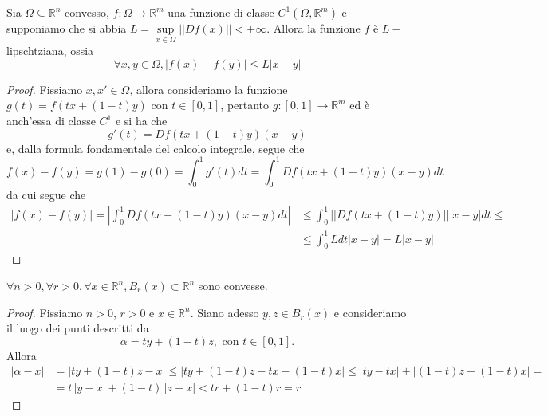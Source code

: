 \begin{theorem}
	Sia $\Omega \subseteq \mathbb{R}^n$ convesso, $f: \Omega \to \mathbb{R}^m$ una funzione di classe $C^1(\Omega, \mathbb{R}^m)$ e supponiamo che si abbia $L = \sup\limits_{x \in \Omega} ||Df(x)|| < +\infty$. Allora la funzione
	$f$ è $L-$lipschtziana, ossia
	$$
	\forall x, y \in \Omega, |f(x) - f(y)| \leq L|x-y|
	$$
\end{theorem}
\begin{proof}
	Fissiamo $x, x' \in \Omega$, allora consideriamo la funzione $g(t) = f(tx + (1-t)y)$ con $t \in [0, 1]$, pertanto $g: [0, 1] \to \mathbb{R}^m$ ed è anch'essa di classe $C^1$ e si ha che
	$$
	g'(t) = Df(tx + (1-t)y)(x - y)
	$$
	e, dalla formula fondamentale del calcolo integrale, segue che 
	$$
	f(x) - f(y) = g(1) - g(0) = \int_0^1 g'(t)dt = \int_0^1 Df(tx + (1-t)y)(x-y)dt
	$$
	da cui segue che
	\begin{align*}
	|f(x) - f(y)| = |\int_0^1 Df(tx + (1-t)y)(x-y)dt| &\leq \int_0^1 || Df(tx + (1-t)y) || |x-y|dt \leq \\
	&\leq \int_0^1 Ldt |x-y| = L|x-y|
	\end{align*}
\end{proof}
\begin{lemma}
    $\forall n > 0, \forall r > 0, \forall x \in \mathbb{R}^n, B_r(x) \subset \mathbb{R}^n$ sono convesse.
\end{lemma}
\begin{proof}
    Fissiamo $n > 0$, $r > 0$ e $x \in \mathbb{R}^n$. Siano adesso $y, z \in B_r(x)$ e consideriamo il luogo dei punti descritti da
    $$
    \alpha = ty + (1-t)z, \text{ con } t \in [0, 1].
    $$
    Allora
    \begin{align*}
    | \alpha - x | &= |ty + (1-t)z - x| \leq |ty + (1-t)z - tx - (1 - t)x| \leq |ty - tx| + |(1-t)z - (1-t)x| = \\
    &=t \, |y - x| + (1-t) \, |z - x| < tr + (1-t)r = r 
    \end{align*}
\end{proof}
